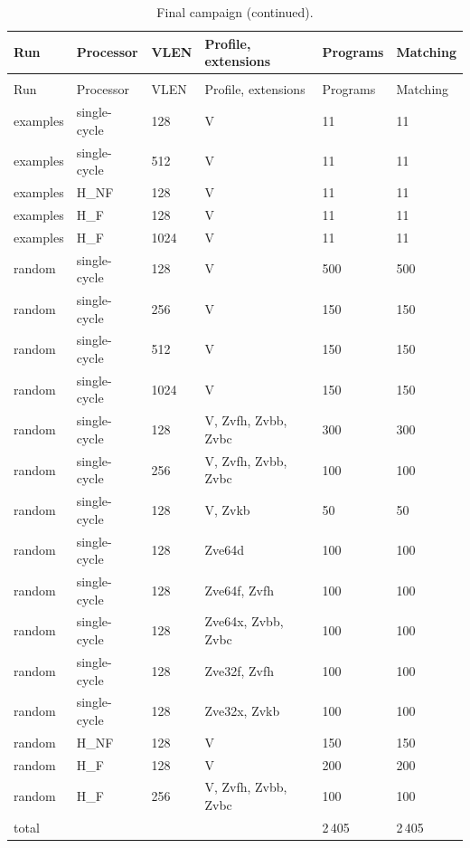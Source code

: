 \documentclass[11pt]{article}
\begin{document}
\small
\begin{longtable}{@{}L{2.0cm}L{1.8cm}L{1.2cm}L{4.4cm}L{1.6cm}L{2.0cm}@{}}
\caption{Final campaign: every program matches Spike.}\label{tab:spike}\\
\toprule
Run & Processor & VLEN & Profile, extensions & Programs & Matching \\
\midrule
\endfirsthead
\caption[]{Final campaign (continued).}\\
\toprule
Run & Processor & VLEN & Profile, extensions & Programs & Matching \\
\midrule
\endhead
examples & single-cycle & 128 & V & 11 & 11 \\
examples & single-cycle & 512 & V & 11 & 11 \\
examples & H\_NF & 128 & V & 11 & 11 \\
examples & H\_F & 128 & V & 11 & 11 \\
examples & H\_F & 1024 & V & 11 & 11 \\
random & single-cycle & 128 & V & 500 & 500 \\
random & single-cycle & 256 & V & 150 & 150 \\
random & single-cycle & 512 & V & 150 & 150 \\
random & single-cycle & 1024 & V & 150 & 150 \\
random & single-cycle & 128 & V, Zvfh, Zvbb, Zvbc & 300 & 300 \\
random & single-cycle & 256 & V, Zvfh, Zvbb, Zvbc & 100 & 100 \\
random & single-cycle & 128 & V, Zvkb & 50 & 50 \\
random & single-cycle & 128 & Zve64d & 100 & 100 \\
random & single-cycle & 128 & Zve64f, Zvfh & 100 & 100 \\
random & single-cycle & 128 & Zve64x, Zvbb, Zvbc & 100 & 100 \\
random & single-cycle & 128 & Zve32f, Zvfh & 100 & 100 \\
random & single-cycle & 128 & Zve32x, Zvkb & 100 & 100 \\
random & H\_NF & 128 & V & 150 & 150 \\
random & H\_F & 128 & V & 200 & 200 \\
random & H\_F & 256 & V, Zvfh, Zvbb, Zvbc & 100 & 100 \\
\midrule
total & & & & 2\,405 & 2\,405 \\
\bottomrule
\end{longtable}
\normalsize
\end{document}
